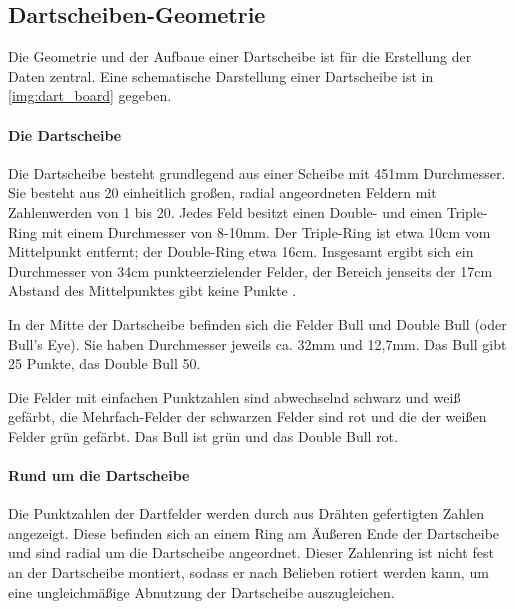 
\subsection{Dartscheiben-Geometrie}  %
\label{sec:dartscheiben_geometrie}

Die Geometrie und der Aufbaue einer Dartscheibe ist für die Erstellung der Daten zentral. Eine schematische Darstellung einer Dartscheibe ist in \autoref{img:dart_board} gegeben.

\paragraph{Die Dartscheibe}

Die Dartscheibe besteht grundlegend aus einer Scheibe mit 451mm Durchmesser. Sie besteht aus 20 einheitlich großen, radial angeordneten Feldern mit Zahlenwerden von 1 bis 20. Jedes Feld besitzt einen Double- und einen Triple-Ring mit einem Durchmesser von 8-10mm. Der Triple-Ring ist etwa 10cm vom Mittelpunkt entfernt; der Double-Ring etwa 16cm. Insgesamt ergibt sich ein Durchmesser von 34cm punkteerzielender Felder, der Bereich jenseits der 17cm Abstand des Mittelpunktes gibt keine Punkte \cite{wdf-rules}.

In der Mitte der Dartscheibe befinden sich die Felder Bull und Double Bull (oder Bull's Eye). Sie haben Durchmesser jeweils ca. 32mm und 12,7mm. Das Bull gibt 25 Punkte, das Double Bull 50.

Die Felder mit einfachen Punktzahlen sind abwechselnd schwarz und weiß gefärbt, die Mehrfach-Felder der schwarzen Felder sind rot und die der weißen Felder grün gefärbt. Das Bull ist grün und das Double Bull rot.

\paragraph{Rund um die Dartscheibe}

Die Punktzahlen der Dartfelder werden durch aus Drähten gefertigten Zahlen angezeigt. Diese befinden sich an einem Ring am Äußeren Ende der Dartscheibe und sind radial um die Dartscheibe angeordnet. Dieser Zahlenring ist nicht fest an der Dartscheibe montiert, sodass er nach Belieben rotiert werden kann, um eine ungleichmäßige Abnutzung der Dartscheibe auszugleichen.

